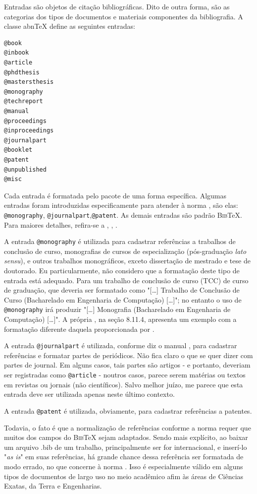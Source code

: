 \begin{apendicesenv}
Entradas são objetos de citação bibliográficas. Dito de outra forma, são as categorias dos tipos de documentos e materiais componentes da bibliografia. A classe abn\TeX{} define as seguintes entradas:

\begin{verbatim}
@book
@inbook
@article
@phdthesis
@mastersthesis
@monography
@techreport
@manual
@proceedings
@inproceedings
@journalpart
@booklet
@patent
@unpublished
@misc
\end{verbatim}

Cada entrada é formatada pelo pacote  de uma forma específica. Algumas entradas foram introduzidas especificamente para atender à norma , são elas: \verb|@monography|, \verb|@journalpart|,\verb|@patent|. As demais entradas são padrão \textsc{Bib}\TeX{}. Para maiores detalhes, refira-se a , , .

A entrada \verb|@monography| é utilizada para cadastrar referências a trabalhos de conclusão de curso, monografias de cursos de especialização (pós-graduação \textit{lato sensu}), e outros trabalhos monográficos, exceto dissertação de mestrado e tese de doutorado. Eu particularmente, não considero que a formatação deste tipo de entrada está adequado. Para um trabalho de conclusão de curso (TCC) de curso de graduação, que deveria ser formatado como "[\ldots] Trabalho de Conclusão de Curso (Bacharelado em Engenharia de Computação) [\ldots]"{}; no entanto o uso de \verb|@monography| irá produzir "[\ldots] Monografia (Bacharelado em Engenharia de Computação) [\ldots]"{}. A própria  , na seção 8.11.4, apresenta um exemplo com a formatação diferente daquela proporcionada por .

A entrada \verb|@journalpart| é utilizada, conforme diz o manual \cite{abnTeX22014d}, para cadastrar referências e formatar partes de periódicos. Não fica claro o que se quer dizer com partes de journal. Em alguns casos, tais partes são artigos - e portanto, deveriam ser registradas como \verb|@article| - noutros casos, parece serem matérias ou textos em revistas ou jornais (não científicos). Salvo melhor juízo, me parece que esta entrada deve ser utilizada apenas neste último contexto.

A entrada \verb|@patent| é utilizada, obviamente, para cadastrar referências a patentes.

Todavia, o fato é que a normalização de referências conforme a norma  requer que muitos dos campos do \textsc{Bib}\TeX{} sejam adaptados. Sendo mais explícito, ao baixar um arquivo {\ttfamily .bib} de um trabalho, principalmente ser for internacional, e inserí-lo "\textit{as is}"{} em suas referências, há grande chance dessa referência ser formatada de modo errado, no que concerne à norma . Isso é especialmente válido em alguns tipos de documentos de largo uso no meio acadêmico afim às áreas de Ciências Exatas, da Terra e Engenharias.


\end{apendicesenv}
